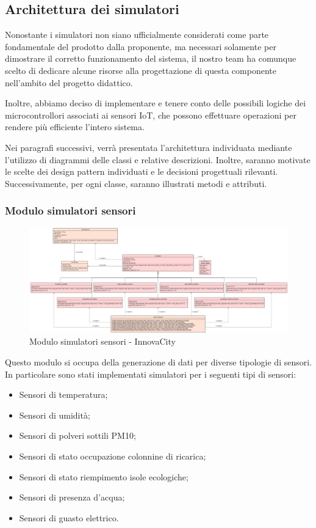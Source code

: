 \subsection{Architettura dei simulatori} \label{sec:architettura_simulatori}
Nonostante i simulatori non siano ufficialmente considerati come parte fondamentale del prodotto dalla proponente, ma necessari solamente per dimostrare il corretto funzionamento del sistema, il nostro team ha comunque scelto di dedicare alcune risorse alla progettazione di questa componente nell'ambito del progetto didattico.

Inoltre, abbiamo deciso di implementare e tenere conto delle possibili logiche dei microcontrollori associati ai sensori IoT, che possono effettuare operazioni per rendere più efficiente l'intero sistema.

Nei paragrafi successivi, verrà presentata l'architettura individuata mediante l'utilizzo di diagrammi delle classi e relative descrizioni. Inoltre, saranno motivate le scelte dei design pattern individuati e le decisioni progettuali rilevanti. Successivamente, per ogni classe, saranno illustrati metodi e attributi.

\subsubsection{Modulo simulatori sensori}
\begin{figure}[H]
    \centering
    \includegraphics[width=1.1\textwidth]{../Images/SpecificaTecnica/simulatoriSensori.PNG}
    \caption{Modulo simulatori sensori - InnovaCity}
    \label{fig: Modulo_simulatori_sensori}
\end{figure}
Questo modulo si occupa della generazione di dati per diverse tipologie di sensori.
In particolare sono stati implementati simulatori per i seguenti tipi di sensori:
\begin{itemize}
    \item Sensori di temperatura;
    \item Sensori di umidità;
    \item Sensori di polveri sottili PM10;
    \item Sensori di stato occupazione colonnine di ricarica;
    \item Sensori di stato riempimento isole ecologiche;
    \item Sensori di presenza d'acqua;
    \item Sensori di guasto elettrico.
\end{itemize}
